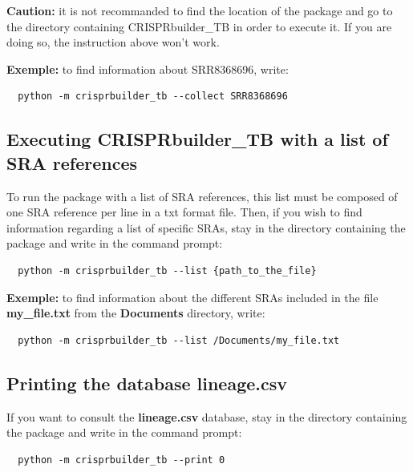 \documentclass[twoside,a4paper,11pt,frenchb,openany]{report}
\begin{document}
\textbf{Caution:} it is not recommanded to find the location of the
package and go to the directory containing CRISPRbuilder\_TB in order to
execute it. If you are doing so, the instruction above won't work.

    \textbf{Exemple:} to find information about SRR8368696, write:

    \begin{verbatim}
  python -m crisprbuilder_tb --collect SRR8368696
\end{verbatim}


    \subsection*{Executing CRISPRbuilder\_TB with a list of SRA
references}\label{executing-crisprbuilder_tb-with-a-list-of-sra-references}

    To run the package with a list of SRA references, this list must be
composed of one SRA reference per line in a txt format file. Then, if
you wish to find information regarding a list of specific SRAs, stay in
the directory containing the package and write in the command prompt:

    \begin{verbatim}
  python -m crisprbuilder_tb --list {path_to_the_file}
\end{verbatim}

    \textbf{Exemple:} to find information about the different SRAs included
in the file \textbf{my\_file.txt} from the \textbf{Documents} directory,
write:

    \begin{verbatim}
  python -m crisprbuilder_tb --list /Documents/my_file.txt
\end{verbatim}



    \subsection*{Printing the database
lineage.csv}\label{printing-the-database-lineage.csv}

    If you want to consult the \textbf{lineage.csv} database, stay in the
directory containing the package and write in the command prompt:

    \begin{verbatim}
  python -m crisprbuilder_tb --print 0
\end{verbatim}
\end{document}
